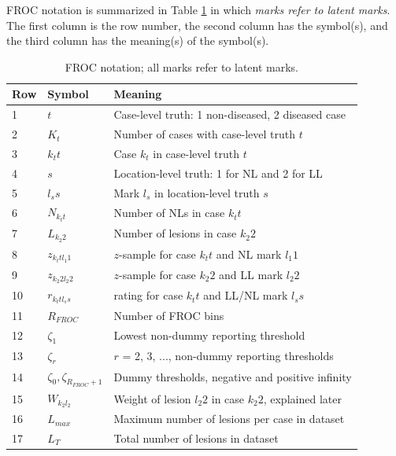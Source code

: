 \documentclass[
]{book}
\begin{document}
FROC notation is summarized in Table \ref{tab:empirical-notation} in which \emph{marks refer to latent marks}. The first column is the row number, the second column has the symbol(s), and the third column has the meaning(s) of the symbol(s).

\begin{table}

\caption{\label{tab:empirical-notation}FROC notation; all marks refer to latent marks.}
\centering
\begin{tabular}[t]{l|l|l}
\hline
Row & Symbol & Meaning\\
\hline
1 & $t$ & Case-level truth: 1 non-diseased, 2 diseased case\\
\hline
2 & $K_t$ & Number of cases with case-level truth $t$\\
\hline
3 & $k_t t$ & Case $k_t$ in case-level truth $t$\\
\hline
4 & $s$ & Location-level truth: 1 for NL and 2 for LL\\
\hline
5 & $l_s s$ & Mark $l_s$ in location-level truth $s$\\
\hline
6 & $N_{k_t t}$ & Number of NLs in case $k_t t$\\
\hline
7 & $L_{k_2 2}$ & Number of lesions in case $k_2 2$\\
\hline
8 & $z_{k_t t l_1 1}$ & $z$-sample for case $k_t t$ and NL mark $l_1 1$\\
\hline
9 & $z_{k_2 2 l_2 2}$ & $z$-sample for case $k_2 2$ and LL mark $l_2 2$\\
\hline
10 & $r_{k_t t l_s s}$ & rating for case $k_t t$ and LL/NL mark $l_s s$\\
\hline
11 & $R_{FROC}$ & Number of FROC bins\\
\hline
12 & $\zeta_1$ & Lowest non-dummy reporting threshold\\
\hline
13 & $\zeta_r$ & $r$ = 2, 3, ..., non-dummy reporting thresholds\\
\hline
14 & $\zeta_0, \zeta_{R_{FROC}+1}$ & Dummy thresholds, negative and positive infinity\\
\hline
15 & $W_{k_2 l_2}$ & Weight of lesion $l_2 2$ in case $k_2 2$, explained later\\
\hline
16 & $L_{max}$ & Maximum number of lesions per case in dataset\\
\hline
17 & $L_T$ & Total number of lesions in dataset\\
\hline
\end{tabular}
\end{table}
\end{document}
